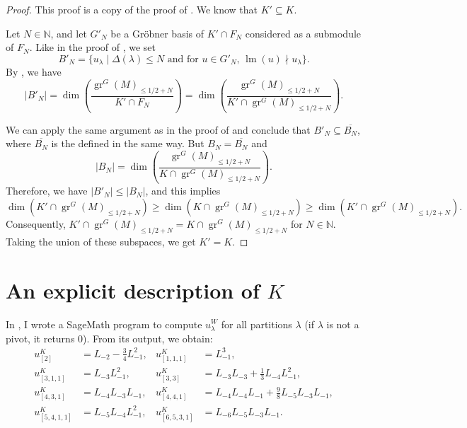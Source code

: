 \documentclass[a4paper, 12pt, reqno]{amsart}
\theoremstyle{remark}
\DeclareMathOperator{\gr}{gr}
\DeclareMathOperator{\lm}{lm}
\begin{document}
\begin{proof}
  This proof is a copy of the proof of .
  We know that $K' \subseteq K$.

  Let $N \in \mathbb{N}$, and let $G'_N$ be a Gröbner basis of $K' \cap F_N$ considered as a submodule of $F_N$.
  Like in the proof of , we set
  \begin{equation*}
    B'_N = \{u_{\lambda} \mid \text{$\Delta(\lambda) \le N$ and for $u \in G'_N$, $\lm(u) \nmid u_{\lambda}$}\}.
  \end{equation*}
  By \cite[Proposition 3.6.4]{adams_introduction_1994}, we have
  \begin{equation*}
    |B'_N| = \dim\left(\frac{\gr^G(M)_{\le 1/2 + N}}{K' \cap F_N}\right) = \dim\left(\frac{\gr^G(M)_{\le 1/2 + N}}{K' \cap \gr^G(M)_{\le 1/2 + N}}\right).
  \end{equation*}

  We can apply the same argument as in the proof of  and conclude that $B'_N \subseteq \overline{B_N}$, where $\overline{B_N}$ is the defined in the same way.
  But $B_N = \overline{B_N}$ and
  \begin{equation*}
    |B_N| = \dim\left(\frac{\gr^G(M)_{\le 1/2 + N}}{K \cap \gr^G(M)_{\le 1/2 + N}}\right).
  \end{equation*}
  Therefore, we have $|B'_N| \le |B_N|$, and this implies
  \begin{equation*}
    \dim(K' \cap \gr^G(M)_{\le 1/2 + N}) \ge \dim(K \cap \gr^G(M)_{\le 1/2 + N}) \ge \dim(K' \cap \gr^G(M)_{\le 1/2 + N}).
  \end{equation*}
  Consequently, $K' \cap \gr^G(M)_{\le 1/2 + N} = K \cap \gr^G(M)_{\le 1/2 + N}$ for $N \in \mathbb{N}$.
  Taking the union of these subspaces, we get $K' = K$.
\end{proof}

\appendix
\section{An explicit description of $K$}
\label{sec:an-expl-descr}

In \cite[ising-modules.ipynb]{sagemath2}, I wrote a SageMath program to compute $u^W_{\lambda}$ for all partitions $\lambda$ (if $\lambda$ is not a pivot, it returns $0$).
From its output, we obtain:
\begin{align*}
  u^K_{[2]} &= L_{-2} - \tfrac{3}{4}L_{-1}^2, &u^K_{[1, 1, 1]} &= L_{-1}^3, \\
  u^K_{[3, 1, 1]} &= L_{-3}L_{-1}^2, &u^K_{[3, 3]} &= L_{-3}L_{-3} + \tfrac{1}{3}L_{-4}L_{-1}^2, \\
  u^K_{[4, 3, 1]} &= L_{-4}L_{-3}L_{-1}, &u^K_{[4, 4, 1]} &= L_{-4}L_{-4}L_{-1} + \tfrac{9}{8}L_{-5}L_{-3}L_{-1}, \\
  u^K_{[5, 4, 1, 1]} &= L_{-5}L_{-4}L_{-1}^2, &u^K_{[6, 5, 3, 1]} &= L_{-6}L_{-5}L_{-3}L_{-1}.
\end{align*}
\end{document}
